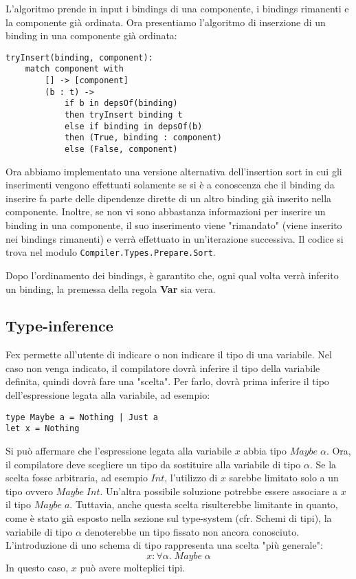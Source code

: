 \documentclass[10pt,a4paper]{article}
\begin{document}
L'algoritmo prende in input i bindings di una componente, i bindings rimanenti e la componente già ordinata. Ora
presentiamo l'algoritmo di inserzione di un binding in una componente già ordinata:
\begin{lstlisting}
tryInsert(binding, component):
    match component with
        [] -> [component]
        (b : t) ->
            if b in depsOf(binding)
            then tryInsert binding t
            else if binding in depsOf(b)
            then (True, binding : component)
            else (False, component)
\end{lstlisting}
Ora abbiamo implementato una versione alternativa dell'insertion sort in cui gli inserimenti vengono effettuati
solamente se si è a conoscenza che il binding da inserire fa parte delle dipendenze dirette di un altro binding già
inserito nella componente. Inoltre, se non vi sono abbastanza informazioni per inserire un binding in una componente,
il suo inserimento viene "rimandato" (viene inserito nei bindings rimanenti) e verrà effettuato in un'iterazione
successiva. Il codice si trova nel modulo \texttt{Compiler.Types.Prepare.Sort}.

Dopo l'ordinamento dei bindings, è garantito che, ogni qual volta verrà inferito un binding, la premessa
della regola \textbf{Var} sia vera.

\subsection{Type-inference}
Fex permette all'utente di indicare o non indicare il tipo di una variabile. Nel caso non venga indicato, il
compilatore dovrà inferire il tipo della variabile definita, quindi dovrà fare una "scelta". Per farlo, dovrà prima
inferire il tipo dell'espressione legata alla variabile, ad esempio:
\begin{lstlisting}
type Maybe a = Nothing | Just a
let x = Nothing
\end{lstlisting}
Si può affermare che l'espressione legata alla variabile $ x $ abbia tipo $ Maybe \; \alpha $. Ora, il compilatore
deve scegliere un tipo da sostituire alla variabile di tipo $ \alpha $. Se la scelta fosse arbitraria, ad esempio
$ Int $, l'utilizzo di $ x $ sarebbe limitato solo a un tipo ovvero $ Maybe \; Int $. Un'altra possibile soluzione
potrebbe essere associare a $ x $ il tipo $ Maybe \; a $. Tuttavia, anche questa scelta risulterebbe limitante in quanto,
come è stato già esposto nella sezione sul type-system (cfr. Schemi di tipi), la variabile di tipo $ \alpha $
denoterebbe un tipo fissato non ancora conosciuto. L'introduzione di uno schema di tipo rappresenta una scelta
"più generale":
\[ x : \forall \alpha. \; Maybe \; \alpha \]
In questo caso, $ x $ può avere molteplici tipi.
\end{document}
